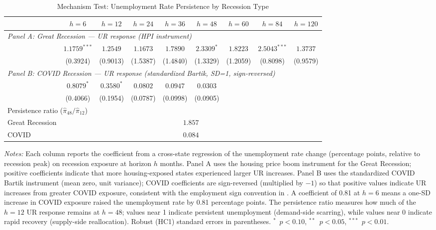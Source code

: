 \documentclass[12pt]{article}
\begin{document}
\begin{table}[H]
\centering
\caption{Mechanism Test: Unemployment Rate Persistence by Recession Type}
\begin{threeparttable}
\small
\begin{tabular}{lcccccccc}
\toprule
& $h=6$ & $h=12$ & $h=24$ & $h=36$ & $h=48$ & $h=60$ & $h=84$ & $h=120$ \\
\midrule
\multicolumn{9}{l}{\textit{Panel A: Great Recession --- UR response (HPI instrument)}} \\[3pt]
& $1.1759^{***}$ & $1.2549$ & $1.1673$ & $1.7890$ & $2.3309^{*}$ & $1.8223$ & $2.5043^{***}$ & $1.3737$ \\
& (0.3924) & (0.9013) & (1.5387) & (1.4840) & (1.3329) & (1.2059) & (0.8098) & (0.9579) \\
\midrule
\multicolumn{9}{l}{\textit{Panel B: COVID Recession --- UR response (standardized Bartik, SD=1, sign-reversed)}} \\[3pt]
& $0.8079^{*}$ & $0.3580^{*}$ & $0.0802$ & $0.0947$ & $0.0303$ & & & \\
& (0.4066) & (0.1954) & (0.0787) & (0.0998) & (0.0905) & & & \\
\midrule
\multicolumn{9}{l}{Persistence ratio ($\hat{\pi}_{48} / \hat{\pi}_{12}$)} \\[3pt]
Great Recession & \multicolumn{8}{c}{$1.857$} \\
COVID & \multicolumn{8}{c}{$0.084$} \\
\bottomrule
\end{tabular}
\begin{tablenotes}[flushleft]
\small
\item \textit{Notes:} Each column reports the coefficient from a cross-state regression of the unemployment rate change (percentage points, relative to recession peak) on recession exposure at horizon $h$ months. Panel A uses the housing price boom instrument for the Great Recession; positive coefficients indicate that more housing-exposed states experienced larger UR increases. Panel B uses the standardized COVID Bartik instrument (mean zero, unit variance); COVID coefficients are sign-reversed (multiplied by $-1$) so that positive values indicate UR increases from greater COVID exposure, consistent with the employment sign convention in . A coefficient of 0.81 at $h=6$ means a one-SD increase in COVID exposure raised the unemployment rate by 0.81 percentage points. The persistence ratio measures how much of the $h=12$ UR response remains at $h=48$; values near 1 indicate persistent unemployment (demand-side scarring), while values near 0 indicate rapid recovery (supply-side reallocation). Robust (HC1) standard errors in parentheses. $^{*}$~$p<0.10$, $^{**}$~$p<0.05$, $^{***}$~$p<0.01$.
\end{tablenotes}
\end{threeparttable}
\label{tab:mechanism}
\end{table}
\end{document}
